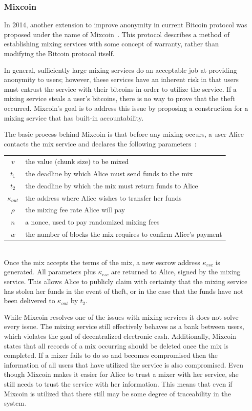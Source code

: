 \documentclass[11pt]{article}
\begin{document}
\subsubsection{Mixcoin} In 2014, another extension to improve anonymity in current Bitcoin protocol was proposed under
the name of Mixcoin~\cite{bonneau14}. This protocol describes a method of establishing mixing services with some concept
of warranty, rather than modifying the Bitcoin protocol itself.

In general, sufficiently large mixing services do an acceptable job at providing anonymity to users; however, these
services have an inherent risk in that users must entrust the service with their bitcoins in order to utilize the
service.  If a mixing service steals a user's bitcoins, there is no way to prove that the theft occurred. Mixcoin's goal
is to address this issue by proposing a construction for a mixing service that has built-in accountability.

The basic process behind Mixcoin is that before any mixing occurs, a user Alice contacts the mix service and declares
the following parameters~\cite{bonneau14}:\\ \begin{tabular}{cl} $v$ & the value (chunk size) to be mixed\\ $t_1$ & the
deadline by which Alice must send funds to the mix\\ $t_2$ & the deadline by which the mix must return funds to Alice\\
$\kappa_{out}$ & the address where Alice wishes to transfer her funds\\ $\rho$ & the mixing fee rate Alice will pay\\
$n$ & a nonce, used to pay randomized mixing fees\\ $w$ & the number of blocks the mix requires to confirm Alice's
payment \end{tabular}\vspace{1em}\\ Once the mix accepts the terms of the mix, a new escrow address $\kappa_{esc}$ is
generated. All parameters plus $\kappa_{esc}$ are returned to Alice, signed by the mixing service. This allows Alice to
publicly claim with certainty that the mixing service has stolen her funds in the event of theft, or in the case that
the funds have not been delivered to $\kappa_{out}$ by $t_2$.

While Mixcoin resolves one of the issues with mixing services it does not solve every issue. The mixing service still
effectively behaves as a bank between users, which violates the goal of decentralized electronic cash. Additionally,
Mixcoin states that all records of a mix occurring should be deleted once the mix is completed. If a mixer fails to do
so and becomes compromised then the information of all users that have utilized the service is also compromised.  Even
though Mixcoin makes it easier for Alice to trust a mixer with her service, she still needs to trust the service with
her information. This means that even if Mixcoin is utilized that there still may be some degree of traceability in the
system.
\end{document}
